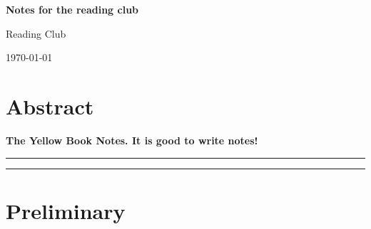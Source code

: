 \documentclass[submission, PhysLectNotes]{SciPost}
\begin{document}
\begin{center}{\Large \textbf{
Notes for  the reading club\\
}}\end{center}

\begin{center}
Reading Club%
\end{center}

\begin{center}
\end{center}

\begin{center}
\today
\end{center}


\section*{Abstract}
{\bf
The Yellow Book Notes. It is good to write notes!
}


\vspace{10pt}
\noindent\rule{\textwidth}{1pt}
\tableofcontents\thispagestyle{fancy}
\noindent\rule{\textwidth}{1pt}
\vspace{10pt}


\section{Preliminary}
\end{document}

